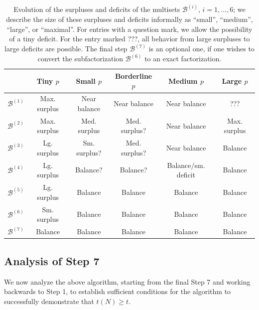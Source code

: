 \documentclass[12pt,a4paper,reqno]{amsart}
\numberwithin{equation}{section}
\theoremstyle{plain}
\theoremstyle{definition}
\newcommand\tuple{{\mathcal B}}
\begin{document}
\begin{table}[ht]
  \centering
  \begin{tabular}{|c|c|c|c|c|c|}
  \hline
   & Tiny $p$ & Small $p$ & Borderline $p$ & Medium $p$ & Large $p$ \\
  \hline
  $\tuple^{(1)}$ & Max. surplus & Near balance & Near balance & Near balance & ??? \\
  $\tuple^{(2)}$ & Max. surplus & Med. surplus & Med. surplus? & Near balance & Max. surplus \\
  $\tuple^{(3)}$ & Lg. surplus & Sm. surplus? & Med. surplus? & Near balance & Balance \\
  $\tuple^{(4)}$ & Lg. surplus & Balance? & Balance?
 & Balance/sm. deficit & Balance \\
  $\tuple^{(5)}$ & Lg. surplus & Balance & Balance & Balance  & Balance \\
  $\tuple^{(6)}$ & Sm. surplus & Balance & Balance & Balance  & Balance \\
  $\tuple^{(7)}$ & Balance & Balance & Balance & Balance  & Balance \\ 
  \hline
  \end{tabular}
  \caption{Evolution of the surpluses and deficits of the multisets $\tuple^{(i)}$, $i=1,\dots,6$; we describe the size of these surpluses and deficits informally as ``small'', ``medium'', ``large'', or ``maximal''.  For entries with a question mark, we allow the possibility of a tiny deficit.  For the entry marked ???, all behavior from large surpluses to large deficits are possible. The final step $\tuple^{(7)}$ is an optional one, if one wishes to convert the subfactorization $\tuple^{(6)}$ to an exact factorization.}\label{algorithm-table}
  \end{table}
  

\subsection{Analysis of Step 7}

We now analyze the above algorithm, starting from the final Step 7 and working backwards to Step 1, to establish sufficient conditions for the algorithm to successfully demonstrate that $t(N) \geq t$.
\end{document}
